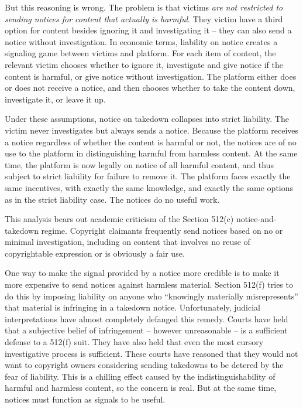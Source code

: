 But this reasoning is wrong. The problem is that victims \emph{are not restricted to sending notices for content that actually is harmful}. They victim have a third option for content besides ignoring it and investigating it -- they can also send a notice without investigation. In economic terms, liability on notice creates a signaling game between victims and platform. For each item of content, the relevant victim chooses whether to ignore it, investigate and give notice if the content is harmful, or give notice without investigation. The platform either does or does not receive a notice, and then chooses whether to take the content down, investigate it, or leave it up.

Under these assumptions, notice on takedown collapses into strict liability. The victim never investigates but always sends a notice. Because the platform receives a notice regardless of whether the content is harmful or not, the notices are of no use to the platform in distinguishing harmful from harmless content. At the same time, the platform is now legally on notice of all harmful content, and thus subject to strict liability for failure to remove it. The platform faces exactly the same incentives, with exactly the same knowledge, and exactly the same options as in the strict liability case. The notices do no useful work.

This analysis bears out academic criticism of the Section 512(c) notice-and-takedown regime. Copyright claimants frequently send notices based on no or minimal investigation, including on content that involves no reuse of copyrightable expression or is obviously a fair use.

One way to make the signal provided by a notice more credible is to make it more expensive to send notices against harmless material. Section 512(f) tries to do this by imposing liability on anyone who ``knowingly materially misrepresents'' that material is infringing in a takedown notice. Unfortunately, judicial interpretations have almost completely defanged this remedy. Courts have held that a subjective belief of infringement -- however unreasonable -- is a sufficient defense to a 512(f) suit. They have also held that even the most cursory investigative process is sufficient. These courts have reasoned that they would not want to copyright owners considering sending takedowns to be detered by the fear of liability. This is a chilling effect caused by the indistinguishability of harmful and harmless content, so the concern is real. But at the same time, notices must function as signals to be useful.

